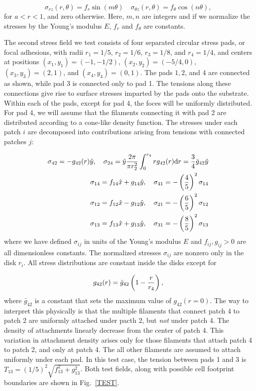 \documentclass[aps,prl,reprint,twocolumn,groupedaddress,showpacs]{revtex4-1}
\def\dd{\mbox{d}}
\begin{document}
\begin{equation}
\sigma_{rz}(r,\theta) = f_{r} \sin (m\theta)\quad \sigma_{\theta z}(r,\theta) = f_{\theta} \cos (n\theta),
\end{equation}
%
for $a < r < 1$, and zero otherwise. Here, $m,n$ are integers and if
we normalize the stresses by the Young's modulus $E$, $f_{r}$ and
$f_{\theta}$ are constants.  

The second stress field we test consists of four separated circular
stress pads, or focal adhesions, with radii $r_{1} = 1/5$, $r_{2} =
1/6$, $r_{3} = 1/8$, and $r_{4} = 1/4$, and centers at positions
$(x_{1},y_{1}) = (-1,-1/2)$, $(x_{2},y_{2}) = (-5/4,0)$,
$(x_{3},y_{3}) = (2,1)$, and $(x_{4},y_{4}) = (0,1)$.  The pads $1,2$,
and 4 are connected as shown, while pad 3 is connected only to pad
1. The tensions along these connections give rise to surface stresses
imparted by the pads onto the substrate.  Within each of the pads,
except for pad 4, the foces will be uniformly distributed.  For pad 4,
we will assume that the filaments connecting it with pad 2 are
distributed according to a cone-like density function.  The stresses
under each patch $i$ are decomposed into contributions arising from
tensions with connected patches $j$:

\begin{align}
\sigma_{42} = -g_{42}(r)\hat{y}, \quad \sigma_{24} = \hat{y} {2\pi \over \pi r_{2}^{2}}
\int_{0}^{r_{4}}r g_{42}(r)\dd r = {3\over 4} \bar{g}_{42} \hat{y} \\
\sigma_{14} = f_{14}\hat{x} + g_{14} \hat{y}, \quad \sigma_{41} = -\left({4\over 5}\right)^{2}\sigma_{14} \\
\sigma_{12} = f_{12}\hat{x}-g_{12}\hat{y}, \quad \sigma_{21} = -\left({6\over 5}\right)^{2}\sigma_{12} \\
\sigma_{13} = f_{13}\hat{x} + g_{13}\hat{y}, \quad \sigma_{31} = -\left({8\over 5}\right)^{2}\sigma_{13}
\end{align}
%
where we have defined $\sigma_{ij}$ in units of the Young's modulus $E$ and
$f_{ij}, g_{ij} > 0$ are all dimensionless constants. The normalized 
stresses $\sigma_{ij}$ are nonzero only 
in the disk $r_{i}$. All stress distributions are constant inside 
the disks except for

\begin{equation}
g_{42}(r) = \bar{g}_{42} \left(1-{r \over r_{4}}\right),
\end{equation}
%
where $\bar{g}_{42}$ is a constant that sets the maximum value of
$g_{42}(r=0)$. The way to interpret this physically is that the
multiple filaments that connect patch 4 to patch 2 are uniformly
attached under pacth 2, but {\it not} under patch 4.  The density of
attachments linearly decrease from the center of patch 4. This
variation in attachment density arises only for those filaments that
attach patch 4 to patch 2, and only at patch 4.  The all other
filaments are assumed to attach uniformly under each pad.  In this
test case, the tension between pads 1 and 3 is $T_{13} =
(1/5)^{2}\sqrt{f_{13}^{2} + g_{13}^{2}}$. Both test fields, along with 
possible cell footprint boundaries are shown in
Fig.~\ref{TEST}. 
\end{document}
